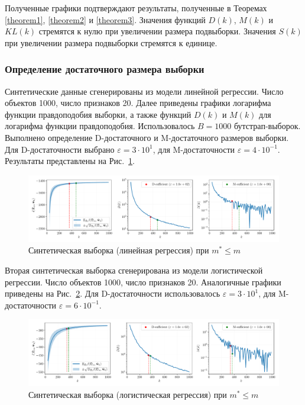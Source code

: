 Полученные графики подтверждают результаты, полученные в Теоремах \ref{theorem1}, \ref{theorem2} и \ref{theorem3}. Значения функций $D(k)$, $M(k)$ и $KL(k)$ стремятся к нулю при увеличении размера подвыборки. Значения $S(k)$ при увеличении размера подвыборки стремятся к единице.

\subsubsection{Определение достаточного размера выборки}

Синтетические данные сгенерированы из модели линейной регрессии. Число объектов 1000, число признаков 20. Далее приведены графики логарифма функции правдоподобия выборки, а также функций $D(k)$ и $M(k)$ для логарифма функции правдоподобия. Использовалось $B=1000$ бутстрап-выборок. Выполнено определение D-достаточного и M-достаточного размеров выборки. Для D-достаточности выбрано $\varepsilon = 3 \cdot 10^{1}$, для M-достаточности $\varepsilon = 4 \cdot 10^{-1}$. Результаты представлены на Рис.~\ref{synthetic-regression-sufficient}. 

\begin{figure}[h!]
    \centering
    \includegraphics[width=\textwidth]{figures/synthetic-regression-sufficient.pdf}
    \caption{Синтетическая выборка (линейная регрессия) при $m^* \leqslant m$}
    \label{synthetic-regression-sufficient}
\end{figure}

Вторая синтетическая выборка сгенерирована из модели логистической регрессии. Число объектов 1000, число признаков 20. Аналогичные графики приведены на Рис.~\ref{synthetic-classification-sufficient}. Для D-достаточности использовалось $\varepsilon = 3 \cdot 10^1$, для M-достаточности $\varepsilon = 6 \cdot 10^{-1}$.

\begin{figure}[h!]
    \centering
    \includegraphics[width=\textwidth]{figures/synthetic-classification-sufficient.pdf}
    \caption{Синтетическая выборка (логистическая регрессия) при $m^* \leqslant m$}
    \label{synthetic-classification-sufficient}
\end{figure}


